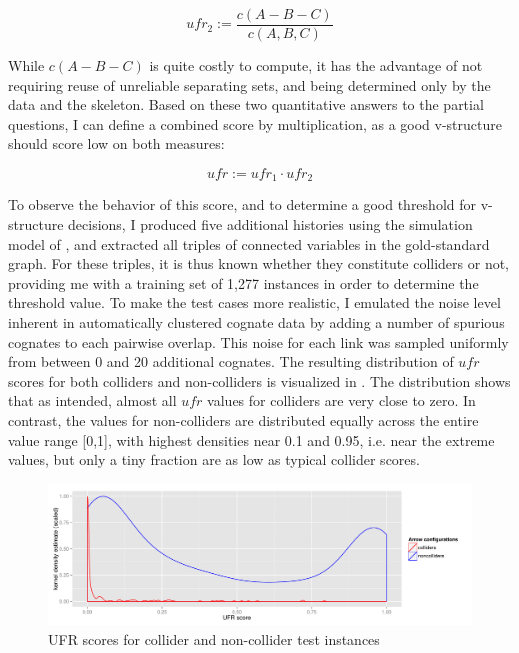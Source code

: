 \begin{equation*}
 ufr_2 := \frac{c(A-B-C)}{c(A,B,C)}
\end{equation*}

While $c(A-B-C)$ is quite costly to compute, it has the advantage of not requiring reuse of unreliable separating sets, and being determined only by the data and the skeleton. Based on these two quantitative answers to the partial questions, I can define a combined score by multiplication, as a good v-structure should score low on both measures:

\begin{equation*}
 ufr := ufr_1 \cdot ufr_2
\end{equation*}
 
To observe the behavior of this \textit{} score, and to determine a good threshold for v-structure decisions, I produced five additional histories using the simulation model of , and extracted all triples of connected variables in the gold-standard graph. For these triples, it is thus known whether they constitute colliders or not, providing me with a training set of 1,277 instances in order to determine the threshold value. To make the test cases more realistic, I emulated the noise level inherent in automatically clustered cognate data by adding a number of spurious cognates to each pairwise overlap. This noise for each link was sampled uniformly from between 0 and 20 additional cognates. The resulting distribution of $ufr$ scores for both colliders and non-colliders is visualized in . The distribution shows that as intended, almost all $ufr$ values for colliders are very close to zero. In contrast, the values for non-colliders are distributed 
equally across the entire value range [0,1], with highest densities near 0.1 and 0.95, i.e. near the extreme values, but only a tiny fraction are as low as typical collider scores.

\begin{figure}
 \includegraphics[width=\textwidth]{figures/ufr-density.pdf}
 \caption{UFR scores for collider and non-collider test instances}
 \label{ufr-scores}
\end{figure}

